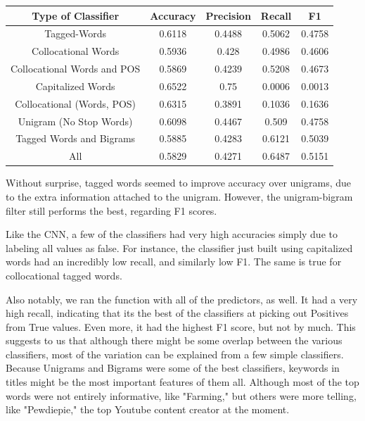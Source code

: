 \documentclass[a4paper,12pt]{article}
\begin{document}
\begin{center}
 \begin{tabular}{|c| c| c| c| c|} 
 \hline
 Type of Classifier & Accuracy & Precision & Recall & F1 \\ [0.5ex] 
\hline
 Tagged-Words  & 0.6118  & 0.4488  &0.5062  & 0.4758\\ 
 \hline
 Collocational Words & 0.5936  & 0.428  &0.4986  & 0.4606\\
 \hline
Collocational Words and POS & 0.5869& 0.4239 & 0.5208& 0.4673\\
\hline
 Capitalized Words & 0.6522  & 0.75 & 0.0006 & 0.0013\\
 \hline
 Collocational (Words, POS)& 0.6315 & 0.3891 & 0.1036 & 0.1636\\
 \hline
 Unigram (No Stop Words) & 0.6098 & 0.4467 &0.509& 0.4758\\
 \hline
 Tagged Words and Bigrams & 0.5885 & 0.4283 & 0.6121& 0.5039\\
 \hline
 All &0.5829 & 0.4271 & 0.6487 &0.5151\\

 \hline

\end{tabular}
\end{center}

Without surprise, tagged words seemed to improve accuracy over unigrams, due to the extra information attached to the unigram. However, the unigram-bigram filter still performs the best, regarding F1 scores. 

Like the CNN, a few of the classifiers had very high accuracies simply due to labeling all values as false. For instance, the classifier just built using capitalized words had an incredibly low recall, and similarly low F1. The same is true for collocational tagged words.  

Also notably, we ran the function with all of the predictors, as well. It had a very high recall, indicating that its the best of the classifiers at picking out Positives from True values. Even more, it had the highest F1 score, but not by much. This suggests to us that although there might be some overlap between the various classifiers, most of the variation can be explained from a few simple classifiers. 
\\

Because Unigrams and Bigrams were some of the best classifiers, keywords in titles might be the most important features of them all. Although most of the top words were not entirely informative, like "Farming," but others were more telling, like "Pewdiepie," the top Youtube content creator at the moment. 
\end{document}
